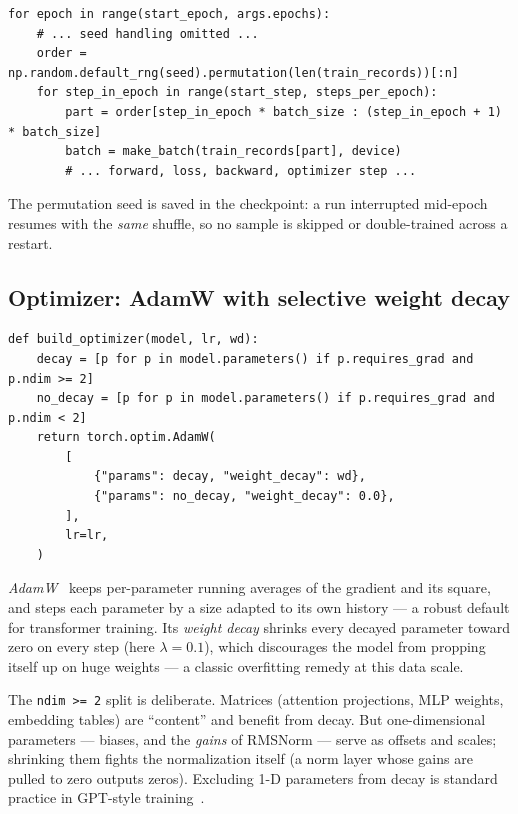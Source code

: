 \documentclass[10pt,a4paper]{article}
\newcommand{\code}[1]{\texttt{#1}}
\begin{document}
\begin{lstlisting}[style=code, caption={Per-epoch shuffling
(\code{train.py}, excerpt). A fresh seed per epoch, stored in the
checkpoint so an interrupted epoch resumes with the same order.},
label={lst:shuffle}]
for epoch in range(start_epoch, args.epochs):
    # ... seed handling omitted ...
    order = np.random.default_rng(seed).permutation(len(train_records))[:n]
    for step_in_epoch in range(start_step, steps_per_epoch):
        part = order[step_in_epoch * batch_size : (step_in_epoch + 1) * batch_size]
        batch = make_batch(train_records[part], device)
        # ... forward, loss, backward, optimizer step ...
\end{lstlisting}

The permutation seed is saved in the checkpoint: a run interrupted
mid-epoch resumes with the \emph{same} shuffle, so no sample is skipped
or double-trained across a restart.

\subsection{Optimizer: AdamW with selective weight decay}

\begin{lstlisting}[style=code, caption={Optimizer construction
(\code{train.py}). Weight decay applies only to parameters with at least
two dimensions --- matrices and embedding tables --- never to biases or
normalization gains.}, label={lst:opt}, float=htbp]
def build_optimizer(model, lr, wd):
    decay = [p for p in model.parameters() if p.requires_grad and p.ndim >= 2]
    no_decay = [p for p in model.parameters() if p.requires_grad and p.ndim < 2]
    return torch.optim.AdamW(
        [
            {"params": decay, "weight_decay": wd},
            {"params": no_decay, "weight_decay": 0.0},
        ],
        lr=lr,
    )
\end{lstlisting}

\emph{AdamW}~\cite{adamw} keeps per-parameter running averages of the
gradient and its square, and steps each parameter by a size adapted to
its own history --- a robust default for transformer training. Its
\emph{weight decay} shrinks every decayed parameter toward zero on every
step (here $\lambda = 0.1$), which discourages the model from propping
itself up on huge weights --- a classic overfitting remedy at this data
scale.

The \code{ndim >= 2} split is deliberate. Matrices (attention
projections, MLP weights, embedding tables) are ``content'' and benefit
from decay. But one-dimensional parameters --- biases, and the
\emph{gains} of RMSNorm --- serve as offsets and scales; shrinking them
fights the normalization itself (a norm layer whose gains are pulled to
zero outputs zeros). Excluding 1-D parameters from decay is standard
practice in GPT-style training~\cite{gpt2}.
\end{document}
